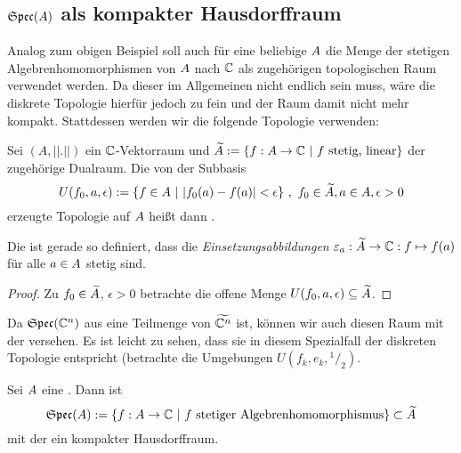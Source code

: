 \subsection{$\mathfrak{Spec}(A)$ als kompakter Hausdorffraum}\label{sec:SpecCA}

Analog zum obigen Beispiel soll auch für eine beliebige \CAlg{} $A$ die Menge der stetigen Algebrenhomomorphismen von $A$ nach $\mathbb{C}$ als zugehörigen topologischen Raum verwendet werden. Da dieser im Allgemeinen nicht endlich sein muss, wäre die diskrete Topologie hierfür jedoch zu fein und der Raum damit nicht mehr kompakt. Stattdessen werden wir die folgende Topologie verwenden:

\begin{defn}[\ssTop]\label{defn:schwachSternTop}
Sei $(A, ||.||)$ ein $\mathbb{C}$-Vektorraum und $\widetilde{A} := \{f: A \to \mathbb{C} ~|~ f \text{ stetig, linear}\}$ der zugehörige Dualraum. Die von der Subbasis
\[ U(f_0, a, \epsilon) := \{f \in A ~|~ |f_0(a)-f(a)| < \epsilon\} ~,~ f_0 \in \widetilde{A}, a \in A, \epsilon > 0\]
erzeugte Topologie auf $A$ heißt dann \emph{\ssTop}.
\end{defn}

\begin{kor}\label{bem:Einsetz-stetig}
Die \ssTop{} ist gerade so definiert, dass die \emph{Einsetzungsabbildungen} $\varepsilon_a: \widetilde{A} \to \mathbb{C}: f \mapsto f(a)$ für alle $a\in A$ stetig sind.
\end{kor}

\begin{proof}
Zu $f_0 \in \widetilde{A}$, $\epsilon > 0$ betrachte die offene Menge $U(f_0, a, \epsilon) \subseteq \widetilde{A}$.
\end{proof}

\begin{bem}
Da $\mathfrak{Spec}(\mathbb{C}^n)$ aus  eine Teilmenge von $\widetilde{\mathbb{C}^n}$ ist, können wir auch diesen Raum mit der \ssTop{} versehen. Es ist leicht zu sehen, dass sie in diesem Spezialfall der diskreten Topologie entspricht (betrachte die Umgebungen $U(f_k, e_k, {}^1/_2)$.
\end{bem}

\begin{lemma}\label{lemma:MA}
Sei $A$ eine \CAlg. Dann ist
\[\mathfrak{Spec}(A) := \{f: A \to \mathbb{C} ~|~ f \text{ stetiger Algebrenhomomorphismus}\} \subset \widetilde{A}\]
mit der \ssTop{} ein kompakter Hausdorffraum.
\end{lemma}

